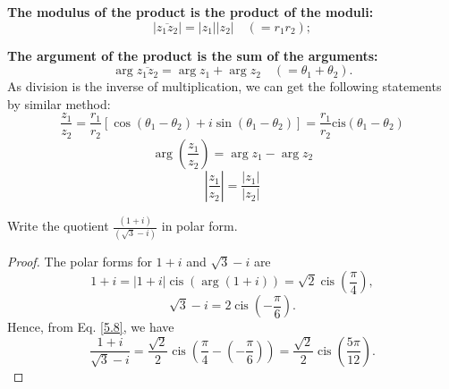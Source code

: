 \documentclass[
	12pt, %
	fleqn, %
	a4paper, %
]{LegrandOrangeBook}
\begin{document}
\textbf{The modulus of the product is the product of the moduli:}
\[
|\overline{z_1z_2}| = |z_1||z_2| \quad (= r_1r_2);
\]


\textbf{The argument of the product is the sum of the arguments:}
\[
\arg \overline{z_1z_2} = \arg z_1 + \arg z_2 \quad (= \theta_1 + \theta_2).
\]
As division is the inverse of multiplication, we can get the following statements by similar method:
\begin{equation} \label{5.8}
    \frac{z_{1}}{z_{2}}=\frac{r_{1}}{r_{2}}\left[\cos\left(\theta_{1}-\theta_{2}\right)+i\sin\left(\theta_{1}-\theta_{2}\right)\right]=\frac{r_{1}}{r_{2}}\mathrm{cis}\left(\theta_{1}-\theta_{2}\right)
\end{equation}
\begin{equation}\label{5.9}
    \arg\left(\frac{z_{1}}{z_{2}}\right)=\arg z_{1}-\arg z_{2} 
\end{equation}
\begin{equation}\label{5.10}
    \left|\frac{z_1}{z_2}\right|=\frac{|z_1|}{|z_2|}
\end{equation}
\begin{example}
    Write the quotient \( \frac{(1 + i)}{(\sqrt{3} - i)} \) in polar form.
\end{example}
\begin{proof}
    The polar forms for \( 1 + i \) and \( \sqrt{3} - i \) are
    \[
    1 + i = |1 + i| \operatorname{cis}(\arg(1 + i)) = \sqrt{2} \operatorname{cis}\left(\frac{\pi}{4}\right),
    \]
    \[
    \sqrt{3} - i = 2 \operatorname{cis}\left(-\frac{\pi}{6}\right).
    \]
    Hence, from Eq. \ref{5.8}, we have
    \[
    \frac{1 + i}{\sqrt{3} - i} = \frac{\sqrt{2}}{2} \operatorname{cis} \left(\frac{\pi}{4} - \left(-\frac{\pi}{6}\right)\right) = \frac{\sqrt{2}}{2} \operatorname{cis}\left(\frac{5\pi}{12}\right).
    \]
    \end{proof}
\end{document}
